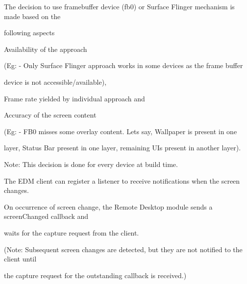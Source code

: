 \-The decision to use framebuffer device (fb0) or \-Surface \-Flinger mechanism is made based on the

following aspects\par



\begin{DoxyItemize}
\item \-Availability of the approach \par

\end{DoxyItemize}

(\-Eg\-: -\/ \-Only \-Surface \-Flinger approach works in some devices as the frame buffer

device is not accessible/available),\par



\begin{DoxyItemize}
\item \-Frame rate yielded by individual approach and \par

\end{DoxyItemize}


\begin{DoxyItemize}
\item \-Accuracy of the screen content \par

\end{DoxyItemize}

(\-Eg\-: -\/ \-F\-B0 misses some overlay content. \-Lets say, \-Wallpaper is present in one

layer, \-Status \-Bar present in one layer, remaining \-U\-Is present in another layer). \par


\-Note\-: \-This decision is done for every device at build time.\par


\-The \-E\-D\-M client can register a listener to receive notifications when the screen changes.

\-On occurrence of screen change, the \-Remote \-Desktop module sends a screen\-Changed callback and

waits for the capture request from the client.

(\-Note\-: \-Subsequent screen changes are detected, but they are not notified to the client until

the capture request for the outstanding callback is received.)\par


